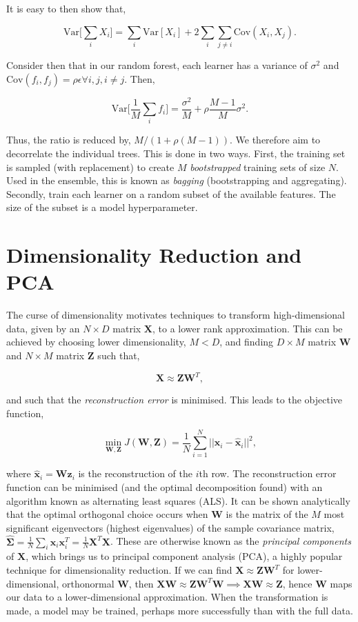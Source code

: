 \documentclass[11pt]{amsart}
\begin{document}
It is easy to then show that,

$$\text{Var}\Big[\sum_i X_i\Big] = \sum_i \text{Var}[X_i] + 2\sum_i\sum_{j \neq i} \text{Cov}(X_i, X_j).$$

Consider then that in our random forest, each learner has a variance of $\sigma^2$ and $\text{Cov}(f_i, f_j) = \rho\epsilon \forall i, j, i \neq j$. Then,

$$\text{Var}\Big[\frac{1}{M}\sum_i f_i\Big] = \frac{\sigma^2}{M} + \rho\frac{M-1}{M}\sigma^2.$$

Thus, the ratio is reduced by, $M/(1 + \rho(M-1))$. We therefore aim to decorrelate the individual trees. This is done in two ways. First, the training set is sampled (with replacement) to create $M$ \emph{bootstrapped} training sets of size $N$. Used in the ensemble, this is known as \emph{bagging} (bootstrapping and aggregating). Secondly, train each learner on a random subset of the available features. The size of the subset is a model hyperparameter.

\section{Dimensionality Reduction and PCA}

The curse of dimensionality motivates techniques to transform high-dimensional data, given by an $N \times D$ matrix $\mathbf{X}$, to a lower rank approximation. This can be achieved by choosing lower dimensionality, $M  < D$, and finding $D \times M$ matrix $\mathbf{W}$ and $N \times M$ matrix $\mathbf{Z}$ such that,

$$\mathbf{X} \approx \mathbf{Z}\mathbf{W}^T,$$

and such that the \emph{reconstruction error} is minimised. This leads to the objective function,

$$\min_{\mathbf{W}, \mathbf{Z}} J(\mathbf{W}, \mathbf{Z}) = \frac{1}{N}\sum_{i=1}^N||\mathbf{x}_i - \hat{\mathbf{x}}_i||^2,$$

where $\hat{\mathbf{x}}_i = \mathbf{W}\mathbf{z}_i$ is the reconstruction of the $i$th row. The reconstruction error function can be minimised (and the optimal decomposition found) with an algorithm known as alternating least squares (ALS). It can be shown analytically that the optimal orthogonal choice occurs when $\mathbf{W}$ is the matrix of the $M$ most significant eigenvectors (highest eigenvalues) of the sample covariance matrix, $\hat{\boldsymbol\Sigma} = \frac{1}{N}\sum_i\mathbf{x}_i\mathbf{x}_i^T = \frac{1}{N}\mathbf{X}^T\mathbf{X}$. These are otherwise known as the \emph{principal components} of $\mathbf{X}$, which brings us to principal component analysis (PCA), a highly popular technique for dimensionality reduction. If we can find $\mathbf{X} \approx \mathbf{Z}\mathbf{W}^T$ for lower-dimensional, orthonormal $\mathbf{W}$, then $\mathbf{X}\mathbf{W} \approx \mathbf{Z}\mathbf{W}^T\mathbf{W} \implies \mathbf{X}\mathbf{W} \approx \mathbf{Z}$, hence $\mathbf{W}$ maps our data to a lower-dimensional approximation. When the transformation is made, a model may be trained, perhaps more successfully than with the full data.
\end{document}
